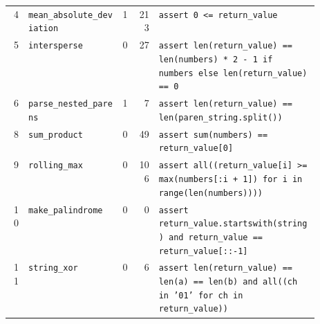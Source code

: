 \begin{footnotesize}
\begin{longtable}{@{}r l r r p{0.52\linewidth}@{}}
4 & \texttt{mean\_absolute\_deviation} & 1 & 213 & \texttt{assert \allowbreak{}0 \allowbreak{}<\allowbreak{}=\allowbreak{} \allowbreak{}return\_value} \\
5 & \texttt{intersperse} & 0 & 27 & \texttt{assert \allowbreak{}len(\allowbreak{}return\_value)\allowbreak{} \allowbreak{}=\allowbreak{}=\allowbreak{} \allowbreak{}len(\allowbreak{}numbers)\allowbreak{} \allowbreak{}*\allowbreak{} \allowbreak{}2 \allowbreak{}-\allowbreak{} \allowbreak{}1 \allowbreak{}if \allowbreak{}numbers \allowbreak{}else \allowbreak{}len(\allowbreak{}return\_value)\allowbreak{} \allowbreak{}=\allowbreak{}=\allowbreak{} \allowbreak{}0} \\
6 & \texttt{parse\_nested\_parens} & 1 & 7 & \texttt{assert \allowbreak{}len(\allowbreak{}return\_value)\allowbreak{} \allowbreak{}=\allowbreak{}=\allowbreak{} \allowbreak{}len(\allowbreak{}paren\_string.\allowbreak{}split(\allowbreak{})\allowbreak{})\allowbreak{}} \\
8 & \texttt{sum\_product} & 0 & 49 & \texttt{assert \allowbreak{}sum(\allowbreak{}numbers)\allowbreak{} \allowbreak{}=\allowbreak{}=\allowbreak{} \allowbreak{}return\_value[\allowbreak{}0]\allowbreak{}} \\
9 & \texttt{rolling\_max} & 0 & 106 & \texttt{assert \allowbreak{}all(\allowbreak{}(\allowbreak{}return\_value[\allowbreak{}i]\allowbreak{} \allowbreak{}>\allowbreak{}=\allowbreak{} \allowbreak{}max(\allowbreak{}numbers[\allowbreak{}:\allowbreak{}i \allowbreak{}+\allowbreak{} \allowbreak{}1]\allowbreak{})\allowbreak{} \allowbreak{}for \allowbreak{}i \allowbreak{}in \allowbreak{}range(\allowbreak{}len(\allowbreak{}numbers)\allowbreak{})\allowbreak{})\allowbreak{})\allowbreak{}} \\
10 & \texttt{make\_palindrome} & 0 & 0 & \texttt{assert \allowbreak{}return\_value.\allowbreak{}startswith(\allowbreak{}string)\allowbreak{} \allowbreak{}and \allowbreak{}return\_value \allowbreak{}=\allowbreak{}=\allowbreak{} \allowbreak{}return\_value[\allowbreak{}:\allowbreak{}:\allowbreak{}-\allowbreak{}1]\allowbreak{}} \\
11 & \texttt{string\_xor} & 0 & 6 & \texttt{assert \allowbreak{}len(\allowbreak{}return\_value)\allowbreak{} \allowbreak{}=\allowbreak{}=\allowbreak{} \allowbreak{}len(\allowbreak{}a)\allowbreak{} \allowbreak{}=\allowbreak{}=\allowbreak{} \allowbreak{}len(\allowbreak{}b)\allowbreak{} \allowbreak{}and \allowbreak{}all(\allowbreak{}(\allowbreak{}ch \allowbreak{}in \allowbreak{}'\allowbreak{}01'\allowbreak{} \allowbreak{}for \allowbreak{}ch \allowbreak{}in \allowbreak{}return\_value)\allowbreak{})\allowbreak{}} \\

\end{longtable}
\end{footnotesize}
